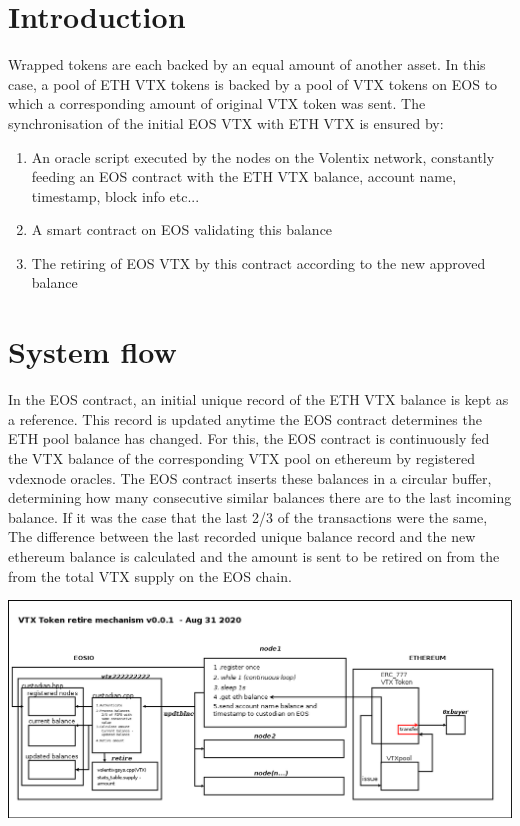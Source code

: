 \hypertarget{introduction}{%
\section{Introduction}\label{introduction}}

Wrapped tokens are each backed by an equal amount of another asset. In
this case, a pool of ETH VTX tokens is backed by a pool of VTX tokens on
EOS to which a corresponding amount of original VTX token was sent. The
synchronisation of the initial EOS VTX with ETH VTX is ensured by:

\begin{enumerate}
\def\labelenumi{\arabic{enumi}.}
\item
  An oracle script executed by the nodes on the Volentix network,
  constantly feeding an EOS contract with the ETH VTX balance, account
  name, timestamp, block info etc...
\item
  A smart contract on EOS validating this balance
\item
  The retiring of EOS VTX by this contract according to the new approved
  balance
\end{enumerate}

\hypertarget{system-flow}{%
\section{System flow}\label{system-flow}}

In the EOS contract, an initial unique record of the ETH VTX balance is
kept as a reference. This record is updated anytime the EOS contract
determines the ETH pool balance has changed. For this, the EOS contract
is continuously fed the VTX balance of the corresponding VTX pool on
ethereum by registered vdexnode oracles. The EOS contract inserts these
balances in a circular buffer, determining how many consecutive similar
balances there are to the last incoming balance. If it was the case that
the last 2/3 of the transactions were the same, The difference between
the last recorded unique balance record and the new ethereum balance is
calculated and the amount is sent to be retired on from the from the
total VTX supply on the EOS chain.

\includegraphics{bridge.png}

